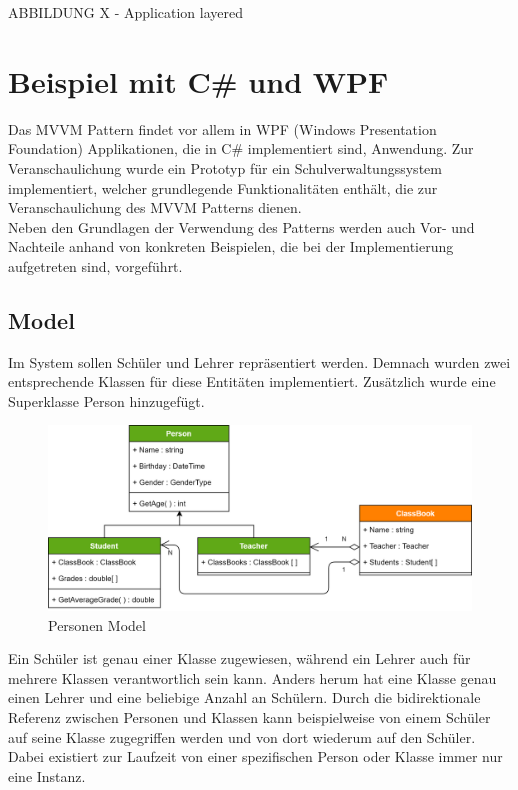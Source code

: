 \documentclass[titlepage=false,12pt]{scrreprt}
\begin{document}
ABBILDUNG X - Application layered

\chapter{Beispiel mit C\# und WPF}

Das MVVM Pattern findet vor allem in WPF (Windows Presentation Foundation) Applikationen, die in C\#
implementiert sind, Anwendung.
Zur Veranschaulichung wurde ein Prototyp für ein Schulverwaltungssystem implementiert, welcher
grundlegende Funktionalitäten enthält, die zur Veranschaulichung des MVVM Patterns dienen.\\
Neben den Grundlagen der Verwendung des Patterns werden auch Vor- und Nachteile anhand von konkreten
Beispielen, die bei der Implementierung aufgetreten sind, vorgeführt.

\section{Model}

Im System sollen Schüler und Lehrer repräsentiert werden. Demnach wurden zwei entsprechende
Klassen für diese Entitäten implementiert. Zusätzlich wurde eine Superklasse Person hinzugefügt.

\begin{figure}[h]
	\includegraphics[width=\textwidth]{SchoolPersonUML.png}
	\caption[]{Personen Model}
\end{figure}

\noindent
Ein Schüler ist genau einer Klasse zugewiesen, während ein Lehrer auch für mehrere Klassen verantwortlich
sein kann. Anders herum hat eine Klasse genau einen Lehrer und eine beliebige Anzahl an Schülern.
Durch die bidirektionale Referenz zwischen Personen und Klassen kann beispielweise von einem Schüler
auf seine Klasse zugegriffen werden und von dort wiederum auf den Schüler. Dabei existiert zur Laufzeit von einer
spezifischen Person oder Klasse immer nur eine Instanz.
\end{document}
